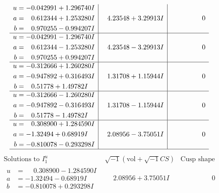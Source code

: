\documentclass[1p]{elsarticle_modified}
\theoremstyle{definition}
\newcommand{\I}{\sqrt{-1}}
\begin{document}
$$\begin{array}{c|c|c}
\begin{aligned}
u &= -0.042991 + 1.296740 I \\
a &= \phantom{-}0.612344 + 1.253280 I \\
b &= \phantom{-}0.970255 - 0.994207 I\end{aligned}
 & \phantom{-}4.23548 + 3.29913 I & \phantom{-0.000000 } 0 \\ \hline\begin{aligned}
u &= -0.042991 - 1.296740 I \\
a &= \phantom{-}0.612344 - 1.253280 I \\
b &= \phantom{-}0.970255 + 0.994207 I\end{aligned}
 & \phantom{-}4.23548 - 3.29913 I & \phantom{-0.000000 } 0 \\ \hline\begin{aligned}
u &= -0.312666 + 1.260280 I \\
a &= -0.947892 + 0.316493 I \\
b &= \phantom{-}0.51778 + 1.49782 I\end{aligned}
 & \phantom{-}1.31708 + 1.15944 I & \phantom{-0.000000 } 0 \\ \hline\begin{aligned}
u &= -0.312666 - 1.260280 I \\
a &= -0.947892 - 0.316493 I \\
b &= \phantom{-}0.51778 - 1.49782 I\end{aligned}
 & \phantom{-}1.31708 - 1.15944 I & \phantom{-0.000000 } 0 \\ \hline\begin{aligned}
u &= \phantom{-}0.308900 + 1.284590 I \\
a &= -1.32494 + 0.68919 I \\
b &= -0.810078 - 0.293298 I\end{aligned}
 & \phantom{-}2.08956 - 3.75051 I & \phantom{-0.000000 } 0\\
 \hline 
 \end{array}$$\newpage$$\begin{array}{c|c|c}  
\text{Solutions to }I^u_{1}& \I (\text{vol} + \sqrt{-1}CS) & \text{Cusp shape}\\
 \hline 
\begin{aligned}
u &= \phantom{-}0.308900 - 1.284590 I \\
a &= -1.32494 - 0.68919 I \\
b &= -0.810078 + 0.293298 I\end{aligned}
 & \phantom{-}2.08956 + 3.75051 I & \phantom{-0.000000 } 0 \\ \hline\begin{aligned}

\end{aligned}
\end{array}$$
\end{document}
